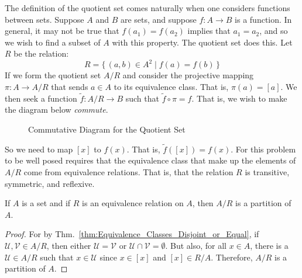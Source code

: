     \begin{example}
        The definition of the quotient set comes naturally when one considers
        functions between sets. Suppose $A$ and $B$ are sets, and suppose
        $f:A\rightarrow{B}$ is a function. In general, it may not be true that
        $f(a_{1})=f(a_{2})$ implies that $a_{1}=a_{2}$, and so we wish to find a
        subset of $A$ with this property. The quotient set does this. Let
        $R$ be the relation:
        \begin{equation}
            R=\{\,(a,b)\in{A}^{2}\;|\;f(a)=f(b)\,\}
        \end{equation}
        If we form the quotient set $A/R$ and consider the projective mapping
        $\pi:A\rightarrow{A}/R$ that sends $a\in{A}$ to its equivalence class.
        That is, $\pi(a)=[a]$. We then seek a function
        $\tilde{f}:A/R\rightarrow{B}$ such that $\tilde{f}\circ{\pi}=f$.
        That is, we wish to make the diagram below \textit{commute}.
        \begin{figure}[H]
            \centering
            
            \label{fig:Comm_Diagram_Quotient_Set}
            \caption{Commutative Diagram for the Quotient Set}
        \end{figure}
        So we need to map $[x]$ to $f(x)$. That is, $\tilde{f}([x])=f(x)$. For
        this problem to be well posed requires that the equivalence class that
        make up the elements of $A/R$ come from equivalence relations. That is,
        that the relation $R$ is transitive, symmetric, and reflexive.
    \end{example}
    \begin{theorem}
        If $A$ is a set and if $R$ is an equivalence relation on $A$, then
        $A/R$ is a partition of $A$.
    \end{theorem}
    \begin{proof}
        For by Thm.~\ref{thm:Equivalence_Classes_Disjoint_or_Equal}, if
        $\mathcal{U},\mathcal{V}\in{A}/R$, then either
        $\mathcal{U}=\mathcal{V}$ or $\mathcal{U}\cap\mathcal{V}=\emptyset$.
        But also, for all $x\in{A}$, there is a $\mathcal{U}\in{A}/R$ such that
        $x\in\mathcal{U}$ since $x\in[x]$ and $[x]\in{R}/A$. Therefore,
        $A/R$ is a partition of $A$.
    \end{proof}